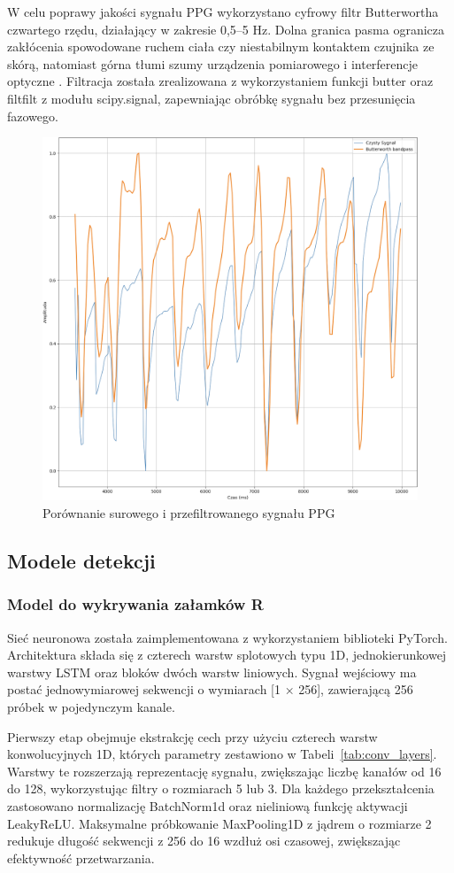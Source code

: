 \documentclass[journal]{IEEEtran}
\begin{document}
W celu poprawy jakości sygnału PPG wykorzystano cyfrowy filtr Butterwortha czwartego rzędu, działający w zakresie 0,5–5 Hz. Dolna granica pasma ogranicza zakłócenia spowodowane ruchem ciała czy niestabilnym kontaktem czujnika ze skórą, natomiast górna tłumi szumy urządzenia pomiarowego i interferencje optyczne  \cite{9}. Filtracja została zrealizowana z wykorzystaniem funkcji butter oraz filtfilt z modułu scipy.signal, zapewniając obróbkę sygnału bez przesunięcia fazowego.

\begin{figure}[htbp]
    \centering
    \includegraphics[width=0.76\linewidth]{Filtr_PPG.png} 
    \caption{Porównanie surowego i przefiltrowanego sygnału PPG}
    \label{fig:filtr_ppg}
\end{figure}

\newpage
\subsection{Modele detekcji}
\subsubsection{Model do wykrywania załamków R}
Sieć neuronowa została zaimplementowana z wykorzystaniem biblioteki PyTorch. Architektura składa się z czterech warstw splotowych typu 1D, jednokierunkowej warstwy LSTM oraz bloków dwóch warstw liniowych. Sygnał wejściowy ma postać jednowymiarowej sekwencji o wymiarach [1 × 256], zawierającą 256 próbek w pojedynczym kanale.

Pierwszy etap obejmuje ekstrakcję cech przy użyciu czterech warstw konwolucyjnych 1D, których parametry zestawiono w Tabeli~\ref{tab:conv_layers}. Warstwy te rozszerzają reprezentację sygnału, zwiększając liczbę kanałów od 16 do 128, wykorzystując filtry o rozmiarach 5 lub 3. Dla każdego przekształcenia zastosowano normalizację BatchNorm1d oraz nieliniową funkcję aktywacji LeakyReLU. Maksymalne próbkowanie MaxPooling1D z jądrem o rozmiarze 2 redukuje długość sekwencji z 256 do 16 wzdłuż osi czasowej, zwiększając efektywność przetwarzania.
\end{document}
